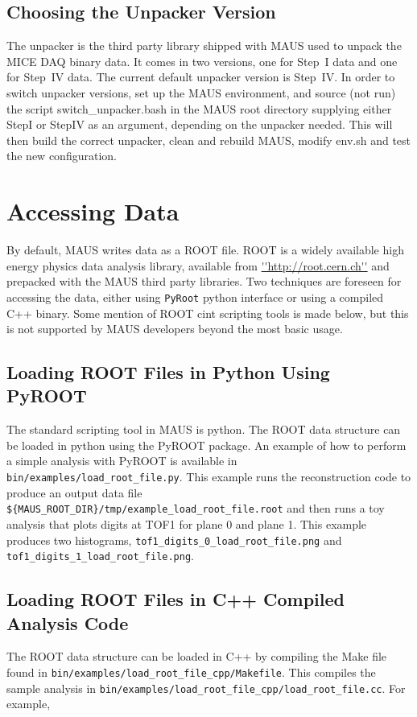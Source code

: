 \subsection{Choosing the Unpacker Version}
The unpacker is the third party library shipped with MAUS used to unpack the MICE DAQ binary data.  It comes in two versions, one for Step~I data and one for Step~IV data.  The current default unpacker version is Step~IV.  In order to switch unpacker versions, set up the MAUS environment, and source (not run) the script switch\_unpacker.bash in the MAUS root directory supplying either StepI or StepIV as an argument, depending on the unpacker needed. This will then build the correct unpacker, clean and rebuild MAUS, modify env.sh and test the new configuration.

\section{Accessing Data}
By default, MAUS writes data as a ROOT file. ROOT is a widely available high energy physics data analysis library, available from \url{''http://root.cern.ch''} and prepacked with the MAUS third party libraries. Two techniques are foreseen for accessing the data, either using \verb|PyRoot| python interface or using a compiled C++ binary. Some mention of ROOT cint scripting tools is made below, but this is not supported by MAUS developers beyond the most basic usage.

\subsection{Loading ROOT Files in Python Using PyROOT}
The standard scripting tool in MAUS is python. The ROOT data structure can be loaded in python using the PyROOT package. An example of how to perform a simple analysis with PyROOT is available in \verb|bin/examples/load_root_file.py|. This example runs the reconstruction code to produce an output data file \verb|${MAUS_ROOT_DIR}/tmp/example_load_root_file.root| and then runs a toy analysis that plots digits at TOF1 for plane 0 and plane 1. This example produces two histograms, \verb|tof1_digits_0_load_root_file.png| and \verb|tof1_digits_1_load_root_file.png|.

\subsection{Loading ROOT Files in C++ Compiled Analysis Code}
The ROOT data structure can be loaded in C++ by compiling the Make file found in \verb|bin/examples/load_root_file_cpp/Makefile|. This compiles the sample analysis in \verb|bin/examples/load_root_file_cpp/load_root_file.cc|. For example,

